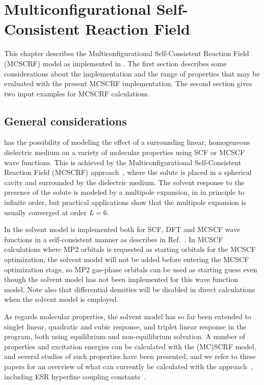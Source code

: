 \section{Multiconfigurational Self-Consistent Reaction Field}\label{sec:mcscrf}

This chapter describes the 
Multiconfigurational Self-Consistent Reaction Field (MCSCRF) model
as implemented in {\dalton}. The first section describes some
considerations about the implementation  and the range of
properties that may be evaluated with the present MCSCRF
implementation. The second section gives two input examples for
MCSCRF calculations.

\subsection{General considerations}\label{sec:solventimpl}

{\dalton} has the possibility of modeling the effect of a
surrounding linear, homogeneous dielectric
medium on a variety of molecular properties using
SCF or MCSCF
wave functions. This is achieved by the Multiconfigurational
Self-Consistent Reaction Field
(MCSCRF)
approach~\cite{kvmedpsjpc91,kvmhahjajthjcp89}, where the solute is
placed in a spherical cavity and surrounded by the
dielectric medium. The solvent response to the presence of the
solute is modeled by a multipole 
expansion, in {\dalton} in principle to infinite order, but
practical applications show that the multipole expansion is
usually converged at order $L=6$.

In {\dalton} the solvent model is implemented both for SCF, DFT and MCSCF wave
functions in a self-consistent manner as describes in
Ref.~\cite{kvmedpsjpc91,kvmhahjajthjcp89}. In MCSCF calculations where
MP2 orbitals is requested as starting orbitals for the MCSCF
optimization, the solvent model will not be added before entering the
MCSCF optimization stage, so MP2 gas-phase orbitals can be used as
starting guess even though the solvent model has not been implemented
for this wave function model. Note also that differential densities will be
disabled in direct calculations when the solvent model is employed.

As regards molecular properties, the solvent model has so far been
extended to singlet linear, quadratic and cubic response, and  triplet
linear response
in the {\resp} program, both using equilibrium and non-equilibrium
solvation. A number of properties and excitation energies can
be calculated with the (MC)SCRF model, and several studies of such
properties have been presented, and we refer to these papers for an
overview of what can currently be calculated with the
approach~\cite{kvmpjhjajjcp100,kvmylhapjjcp100}, including ESR
hyperfine coupling
constants~\cite{bfocobpjkvmjcp104}.

